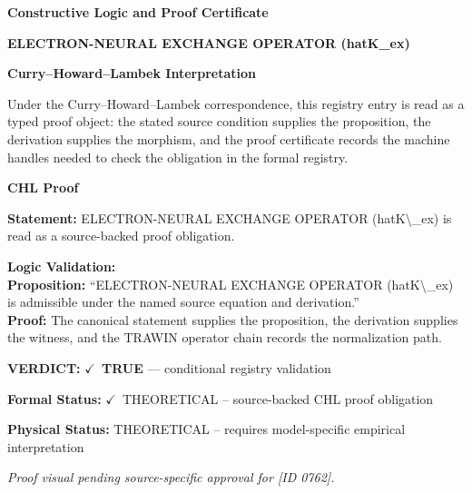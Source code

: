 \clearpage
\begingroup\tzpsupportsetup
\noindent\textbf{\fontsize{10.8pt}{12.8pt}\selectfont [ID 0762] Constructive Logic and Proof Certificate}\par
\noindent\textbf{\fontsize{10pt}{12pt}\selectfont ELECTRON-NEURAL EXCHANGE OPERATOR (hatK\_ex)}\par
\vspace{0.45em}
\begingroup
\footnotesize
\setlength{\parskip}{0.22em}
\setlength{\parindent}{0pt}
\noindent\textbf{Curry--Howard--Lambek Interpretation}\par
Under the Curry--Howard--Lambek correspondence, this registry entry is read as a typed proof
object: the stated source condition supplies the proposition, the derivation supplies the
morphism, and the proof certificate records the machine handles needed to check the obligation
in the formal registry.

\vspace{0.45em}
\noindent\textbf{CHL Proof}\par
\textbf{Statement:} ELECTRON-NEURAL EXCHANGE OPERATOR (hatK\textbackslash{}\_ex) is read as a source-backed proof obligation.

\textbf{Logic Validation:}\\
\textbf{Proposition:} ``ELECTRON-NEURAL EXCHANGE OPERATOR (hatK\textbackslash{}\_ex) is admissible under the named source equation and derivation.''\\
\textbf{Proof:} The canonical statement supplies the proposition, the derivation supplies the witness, and the TRAWIN operator chain records the normalization path.

\textbf{VERDICT:} \ensuremath{\checkmark}\ \textbf{TRUE} --- conditional registry validation

\textbf{Formal Status:} \ensuremath{\checkmark}\ THEORETICAL -- source-backed CHL proof obligation

\textbf{Physical Status:} THEORETICAL -- requires model-specific empirical interpretation
\par\vspace{0.45em}
\par
\vfill
\begingroup\footnotesize\itshape
Proof visual pending source-specific approval for [ID 0762].
\par\endgroup
\vfill
\endgroup
\endgroup
